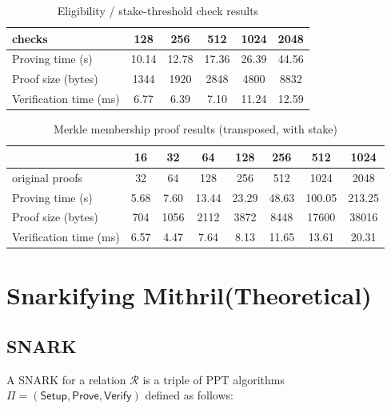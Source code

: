\documentclass{article}
\begin{document}
\begin{table}[htbp]
  \centering
  \caption{Eligibility / stake-threshold check results}
  \renewcommand{\arraystretch}{0.9}
  \setlength{\tabcolsep}{10pt}
  \begin{tabular}{lccccc}
    \toprule
    \textbf{checks} & \textbf{128} & \textbf{256} & \textbf{512} & \textbf{1024} & \textbf{2048} \\
    \midrule
    Proving time (s)     & 10.14 & 12.78 & 17.36 & 26.39 & 44.56 \\
    Proof size (bytes)   & 1344  & 1920  & 2848  & 4800  & 8832 \\
    Verification time (ms) & 6.77  & 6.39  & 7.10  & 11.24 & 12.59 \\
    \bottomrule
  \end{tabular}
  \label{tab:eligibility_check_benchmark_en}
\end{table}


\begin{table}[htbp]
\centering
\caption{Merkle membership proof results (transposed, with stake)}
\renewcommand{\arraystretch}{0.9}
\setlength{\tabcolsep}{8pt}
\begin{tabular}{lccccccc}
\toprule
 & \textbf{16} & \textbf{32} & \textbf{64} & \textbf{128} & \textbf{256} & \textbf{512} & \textbf{1024} \\
\midrule
original proofs    & 32    & 64    & 128   & 256   & 512   & 1024  & 2048   \\
Proving time (s)     & 5.68  & 7.60  & 13.44 & 23.29 & 48.63 & 100.05 & 213.25 \\
Proof size (bytes)    & 704     & 1056    & 2112    & 3872    & 8448    & 17600    & 38016    \\
Verification time (ms) & 6.57  & 4.47  & 7.64  & 8.13  & 11.65 & 13.61  & 20.31  \\
\bottomrule
\end{tabular}
\label{tab:merkle_proof_benchmark_transposed}
\end{table}




\newpage

\section{Snarkifying Mithril(Theoretical)}



\subsection{SNARK}
A SNARK for a relation $\mathcal{R}$ is a triple of PPT algorithms $\Pi = (\mathsf{Setup}, \mathsf{Prove}, \mathsf{Verify})$ defined as follows:
\end{document}
